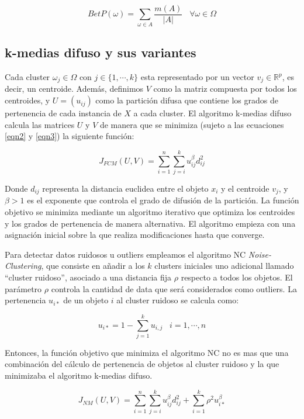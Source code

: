 \begin{equation}
BetP(\omega) = \sum_{\omega \in A} \frac{m(A)}{|A|} \;\;\; \forall \omega \in \Omega
\label{eqn7}
\end{equation}

\subsection{k-medias difuso y sus variantes}

Cada cluster $\omega_j \in \Omega$ con $j \in \{1,\cdots,k\}$ esta representado por un vector $v_j \in \mathbb{R}^p$, es decir, un centroide. Además, definimos $V$ como la matriz compuesta por todos los centroides, y $U = (u_{ij})$ como la partición difusa que contiene los grados de pertenencia de cada instancia de $X$ a cada cluster. El algoritmo k-medias difuso calcula las matrices $U$ y $V$ de manera que se minimiza (sujeto a las ecuaciones \ref{eqn2} y \ref{eqn3}) la siguiente función:

\begin{equation}
J_{FCM}(U,V) = \sum_{i=1}^{n}\sum_{j=i}^{k} u_{ij}^\beta d_{ij}^2
\label{eqn8}
\end{equation}

Donde $d_{ij}$ representa la distancia euclidea entre el objeto $x_i$ y el centroide $v_j$, y $\beta > 1$ es el exponente que controla el grado de difusión de la partición. La función objetivo se minimiza mediante un algoritmo iterativo que optimiza los centroides y los grados de pertenencia de manera alternativa. El algoritmo empieza con una asignación inicial sobre la que realiza modificaciones hasta que converge.

Para detectar datos ruidosos u outliers empleamos el algoritmo NC \textit{Noise-Clustering}, que consiste en añadir a los $k$ clusters iniciales uno adicional llamado ``cluster ruidoso'', asociado a una distancia fija $\rho$ respecto a todos los objetos. El parámetro $\rho$ controla la cantidad de data que será considerados como outliers. La pertenencia $u_{i*}$ de un objeto $i$ al cluster ruidoso se calcula como:

\begin{equation}
u_{i*} = 1 - \sum_{j=1}^{k} u_{i,j} \;\;\; i = {1,\cdots,n}
\label{eqn9}
\end{equation}

Entonces, la función objetivo que minimiza el algoritmo NC no es mas que una combinación del cálculo de pertenencia de objetos al cluster ruidoso y la que minimizaba el algoritmo k-medias difuso.

\begin{equation}
J_{NM}(U,V) = \sum_{i=1}^{n}\sum_{j=i}^{k} u_{ij}^\beta d_{ij}^2 + \sum_{i=1}^{k} \rho^2 u_{i*}^\beta
\label{eqn10}
\end{equation}

